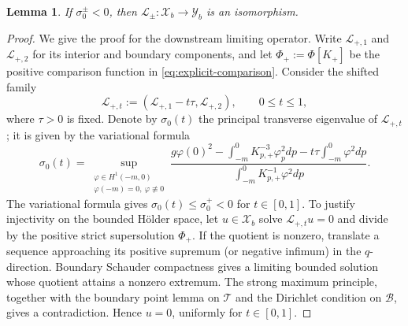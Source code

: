\documentclass[12pt,letterpaper]{amsart}
\newtheorem{lemma}[theorem]{Lemma}
\numberwithin{equation}{section}
\begin{document}
	
	\begin{lemma}\label{lem:limit-invertibility}
	If $\sigma_0^{\pm}<0$, then
	$\mathscr{L}_{\pm}:\mathscr{X}_b\to \mathscr{Y}_b$
	is an isomorphism.
	\end{lemma}
	\begin{proof}
	{We give the proof for the downstream limiting operator. Write $\mathscr L_{+,1}$ and $\mathscr L_{+,2}$ for its interior and boundary components, and let $\Phi_+:=\Phi[K_+]$ be the positive comparison function in \eqref{eq:explicit-comparison}. Consider the shifted family}
\begin{equation*}
	\mathscr L_{+,t}:=
	(\mathscr L_{+,1}-t\tau,\mathscr L_{+,2}),
	\qquad 0\le t\le1,
	\end{equation*}
	{where $\tau>0$ is fixed. Denote by $\sigma_0(t)$ the principal transverse eigenvalue of $\mathscr L_{+,t}$; it is given by the variational formula}
	\begin{equation*}
		\sigma_0(t)=\sup_{\substack{\varphi\in H^1(-m,0)\\
				\varphi(-m)=0,\ \varphi\not\equiv0}}
		\frac{g\varphi(0)^2-
			\displaystyle\int_{-m}^0K_{p,+}^{-3}\varphi_p^2d p-
			t\tau\displaystyle\int_{-m}^0\varphi^2d p}
		{\displaystyle\int_{-m}^0K_{p,+}^{-1}\varphi^2d p}.
	\end{equation*}
	{The variational formula gives $\sigma_0(t)\leq\sigma_0^+<0$ for $t\in[0,1]$. To justify injectivity on the bounded H\"older space, let $u\in\mathscr X_b$ solve $\mathscr L_{+,t}u=0$ and divide by the positive strict supersolution $\Phi_+$. If the quotient is nonzero, translate a sequence approaching its positive supremum (or negative infimum) in the $q$-direction. Boundary Schauder compactness gives a limiting bounded solution whose quotient attains a nonzero extremum. The strong maximum principle, together with the boundary point lemma on $\mathcal T$ and the Dirichlet condition on $\mathcal B$, gives a contradiction. Hence $u=0$, uniformly for $t\in[0,1]$.}
	

\end{proof}
\end{document}
